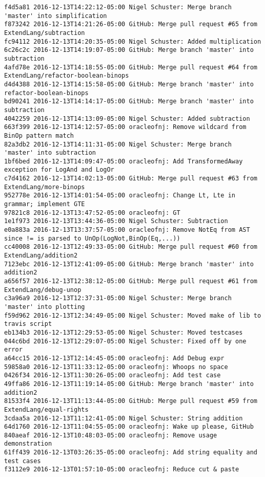 \begin{lstlisting}
f4d5a81 2016-12-13T14:22:12-05:00 Nigel Schuster: Merge branch 'master' into simplification
f873242 2016-12-13T14:21:26-05:00 GitHub: Merge pull request #65 from ExtendLang/subtraction
fc94112 2016-12-13T14:20:35-05:00 Nigel Schuster: Added multiplication
6c26c2c 2016-12-13T14:19:07-05:00 GitHub: Merge branch 'master' into subtraction
4afd78e 2016-12-13T14:18:55-05:00 GitHub: Merge pull request #64 from ExtendLang/refactor-boolean-binops
d4d4388 2016-12-13T14:15:58-05:00 GitHub: Merge branch 'master' into refactor-boolean-binops
bd90241 2016-12-13T14:14:17-05:00 GitHub: Merge branch 'master' into subtraction
4042259 2016-12-13T14:13:09-05:00 Nigel Schuster: Added subtraction
663f399 2016-12-13T14:12:57-05:00 oracleofnj: Remove wildcard from BinOp pattern match
82a3db2 2016-12-13T14:11:31-05:00 Nigel Schuster: Merge branch 'master' into subtraction
1bf6bed 2016-12-13T14:09:47-05:00 oracleofnj: Add TransformedAway exception for LogAnd and LogOr
c7d4162 2016-12-13T14:02:13-05:00 GitHub: Merge pull request #63 from ExtendLang/more-binops
952778e 2016-12-13T14:01:54-05:00 oracleofnj: Change Lt, Lte in grammar; implement GTE
97821c8 2016-12-13T13:47:52-05:00 oracleofnj: GT
1e1f973 2016-12-13T13:44:36-05:00 Nigel Schuster: Subtraction
e0a883a 2016-12-13T13:37:57-05:00 oracleofnj: Remove NotEq from AST since != is parsed to UnOp(LogNot,BinOp(Eq,...))
cc40008 2016-12-13T12:49:33-05:00 GitHub: Merge pull request #60 from ExtendLang/addition2
7123ebc 2016-12-13T12:41:09-05:00 GitHub: Merge branch 'master' into addition2
a656f57 2016-12-13T12:38:12-05:00 GitHub: Merge pull request #61 from ExtendLang/debug-unop
c3a96a9 2016-12-13T12:37:31-05:00 Nigel Schuster: Merge branch 'master' into plotting
f59d962 2016-12-13T12:34:49-05:00 Nigel Schuster: Moved make of lib to travis script
eb134b3 2016-12-13T12:29:53-05:00 Nigel Schuster: Moved testcases
044c6bd 2016-12-13T12:29:07-05:00 Nigel Schuster: Fixed off by one error
a64cc15 2016-12-13T12:14:45-05:00 oracleofnj: Add Debug expr
59858a0 2016-12-13T11:33:12-05:00 oracleofnj: Whoops no space
0426f34 2016-12-13T11:30:26-05:00 oracleofnj: Add test case
49ffa86 2016-12-13T11:19:14-05:00 GitHub: Merge branch 'master' into addition2
81533f4 2016-12-13T11:13:44-05:00 GitHub: Merge pull request #59 from ExtendLang/equal-rights
3cdaa5a 2016-12-13T11:12:41-05:00 Nigel Schuster: String addition
64d1760 2016-12-13T11:04:55-05:00 oracleofnj: Wake up please, GitHub
840aeaf 2016-12-13T10:48:03-05:00 oracleofnj: Remove usage demonstration
61ff439 2016-12-13T03:26:35-05:00 oracleofnj: Add string equality and test cases
f3112e9 2016-12-13T01:57:10-05:00 oracleofnj: Reduce cut & paste

\end{lstlisting}
